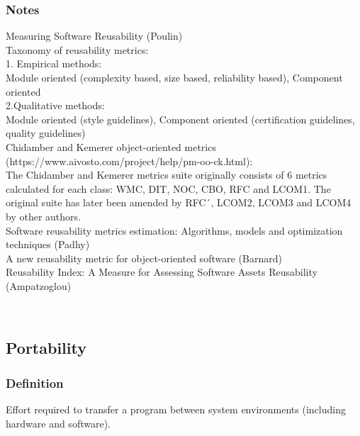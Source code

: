 \documentclass{article}
\begin{document}
\subsubsection{Notes}
\noindent Measuring Software Reusability (Poulin)\\  

Taxonomy of reusability metrics:\\
1. Empirical methods:\\
Module oriented (complexity based, size based, reliability based), 
Component oriented\\

2.Qualitative methods:\\
Module oriented (style guidelines), Component oriented (certification guidelines, quality guidelines)\\

\noindent Chidamber and Kemerer object-oriented metrics (https://www.aivosto.com/project/help/pm-oo-ck.html):\\
The Chidamber and Kemerer metrics suite originally consists of 6 metrics calculated for each class: WMC, DIT, NOC, CBO, RFC and LCOM1. The original suite has later been amended by RFC´, LCOM2, LCOM3 and LCOM4 by other authors.\\ 

\noindent Software reusability metrics estimation: Algorithms, models and optimization techniques (Padhy)\\ 

\noindent A new reusability metric for object-oriented software (Barnard)\\ 

\noindent Reusability Index: A Measure for Assessing Software Assets Reusability (Ampatzoglou) 

~\newpage
\subsection{Portability}
\subsubsection{Definition}
Effort required to transfer a program between system environments (including hardware and software).\\
\end{document}
